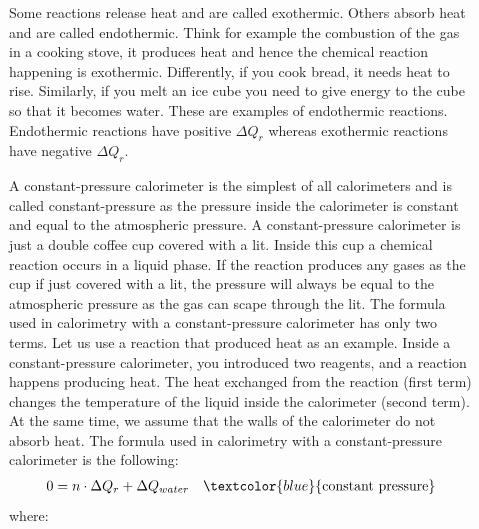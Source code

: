\documentclass[main.tex]{subfiles}
\begin{document}
\begin{description}
\item[] 
Some reactions release heat and are called exothermic. Others absorb heat and are called endothermic. Think for example the combustion of the gas in a cooking stove, it produces heat and hence the chemical reaction happening is exothermic. Differently, if you cook bread, it needs heat to rise. Similarly, if you melt an ice cube you need to give energy to the cube so that it becomes water. These are examples of endothermic reactions. Endothermic reactions have positive  $\Delta Q_{r}$ whereas exothermic reactions have negative $\Delta Q_{r}$.
\item[] 
A constant-pressure calorimeter is the simplest of all calorimeters and is called constant-pressure as the pressure inside the calorimeter is constant and equal to the atmospheric pressure. A constant-pressure calorimeter is just a double coffee cup covered with a lit. Inside this cup a chemical reaction occurs in a liquid phase. If the reaction produces any gases as the cup if just covered with a lit, the pressure will always be equal to the atmospheric pressure as the gas can scape through the lit. The formula used in calorimetry with a constant-pressure calorimeter has only two terms. Let us use a reaction that produced heat as an example. Inside a constant-pressure calorimeter, you introduced two reagents, and a reaction happens producing heat. The heat exchanged from the reaction (first term) changes the temperature of the liquid inside the calorimeter (second term). At the same time, we assume that the walls of the calorimeter do not absorb heat. The formula used in calorimetry with a constant-pressure calorimeter is the following: 
\begin{equation*}\begin{split}
 0=n\cdot\Delta Q_{r}+\Delta Q_{water}  \quad \textcolor{blue}{\text{constant pressure}}
\end{split}\end{equation*}
where:


\end{description}
\end{document}
